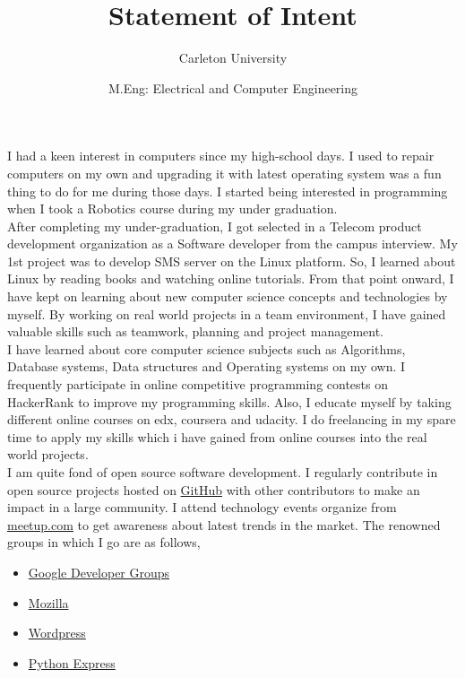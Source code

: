 \documentclass[11pt]{article}
\title{Statement of Intent}
\author{Carleton University}\date{M.Eng: Electrical and Computer Engineering}
\begin{document}
  \maketitle %

I had a keen interest in computers since my high-school days. I used to repair computers on my own and upgrading it with latest operating system was a fun thing to do for me during those days. I started being interested in programming when I took a Robotics course during my under graduation.\\

After completing my under-graduation, I got selected in a Telecom product development organization as a Software developer from the campus interview. My 1st project was to develop SMS server on the Linux platform. So, I learned about Linux by reading books and watching online tutorials. From that point onward, I have kept on learning about new computer science concepts and technologies by myself. By working on real world projects in a team environment, I have gained valuable skills such as teamwork, planning and project management.\\

I have learned about core computer science subjects such as Algorithms, Database systems, Data structures and Operating systems on my own. I frequently participate in online competitive programming contests on HackerRank to improve my programming skills. Also, I educate myself by taking different online courses on edx, coursera and udacity. I do freelancing in my spare time to apply my skills which i have gained from online courses into the real world projects.\\

I am quite fond of open source software development. I regularly contribute in open source projects hosted on \href{http://www.GitHub.com/mehul-m-prajapati}{GitHub} with other contributors to make an impact in a large community. I attend  technology events organize from \href{www.meetup.com}{meetup.com} to get awareness about latest trends in the market. The renowned groups in which I go are as follows,

\begin{itemize}
   \item \href{https://developers.google.com/groups/chapter/106261089114347152720/}{Google Developer Groups}
   
   \item \href{http://mozillaindia.org/}{Mozilla} 
   
   \item \href{https://www.meetup.com/ahmedabad-wp-meetup/members/72560962/}{Wordpress}
   
   \item \href{https://pythonexpress.in/}{Python Express}
\end{itemize}
\end{document}
